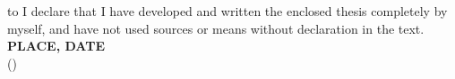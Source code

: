 
\thispagestyle{empty}
\null\vfill
\noindent\hbox to \textwidth{\hrulefill} 
I declare that I have developed and written the enclosed
thesis completely by myself, and have not used sources or means without
declaration in the text.\\
\textbf{PLACE, DATE}
\vspace{1.5cm}
\hspace*{8.0cm}\\
\hspace*{2cm}(\theauthor) 
\cleardoublepage